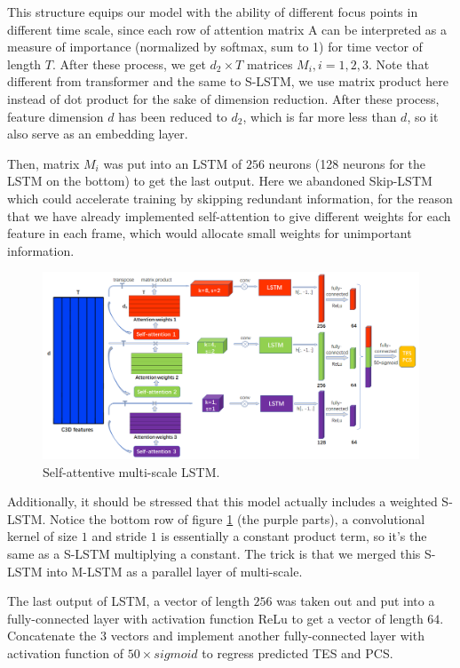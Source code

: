 \documentclass{article}
\begin{document}
This structure equips our model with the ability of different focus points in different time scale, since each row of attention matrix A can be interpreted as a measure of importance (normalized by softmax, sum to 1) for time vector of length $T$. After these process, we get $d_2\times T$ matrices $M_i, i=1,2,3$. Note that different from transformer and the same to S-LSTM, we use matrix product here instead of dot product for the sake of dimension reduction. After these process, feature dimension $d$ has been reduced to $d_2$, which is far more less than $d$, so it also serve as an embedding layer.\par

Then, matrix $M_i$ was put into an LSTM of $256$ neurons (128 neurons for the LSTM on the bottom) to get the last output. Here we abandoned Skip-LSTM which could accelerate training by skipping redundant information, for the reason that we have already implemented self-attention to give different weights for each feature in each frame, which would allocate small weights for unimportant information.\par

\begin{figure}[H]
	\centering
	\includegraphics[width=16cm]{SM-LSTM}
	\caption{Self-attentive multi-scale LSTM.}
	\label{SM-LSTM}
\end{figure}

Additionally, it should be stressed that this model actually includes a weighted S-LSTM. Notice the bottom row of figure \ref{SM-LSTM} (the purple parts), a convolutional kernel of size $1$ and stride $1$ is essentially a constant product term, so it's the same as a S-LSTM multiplying a constant. The trick is that we merged this S-LSTM into M-LSTM as a parallel layer of multi-scale.

The last output of LSTM, a vector of length $256$ was taken out and put into a fully-connected layer with activation function ReLu to get a vector of length $64$. Concatenate the $3$ vectors and implement another fully-connected layer with activation function of $50\times sigmoid$ to regress predicted TES and PCS.
\end{document}
